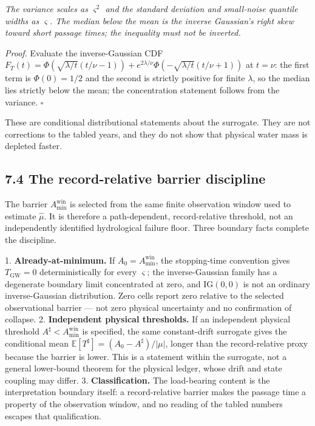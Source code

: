 \documentclass[11pt]{article}
\begin{document}
 \emph{The variance scales as \(\varsigma^2\) and the standard deviation and small-noise quantile widths as \(\varsigma\). The median below the mean is the inverse Gaussian's right skew toward short passage times; the inequality must not be inverted.}

\emph{Proof.} Evaluate the inverse-Gaussian CDF \(F_T(t) =\allowbreak{} \Phi(\sqrt{\lambda/\allowbreak{}t}(t/\nu - 1)) +\allowbreak{} e^{2\lambda/\nu}\Phi(-\sqrt{\lambda/\allowbreak{}t}(t/\nu +\allowbreak{} 1))\) at \(t = \nu\): the first term is \(\Phi(0) = 1/\allowbreak{}2\) and the second is strictly positive for finite \(\lambda\), so the median lies strictly below the mean; the concentration statement follows from the variance. \(\square\)

These are conditional distributional statements about the surrogate. They are not corrections to the tabled years, and they do not show that physical water mass is depleted faster.

\subsection*{7.4 The record-relative barrier discipline}\label{74-the-record-relative-barrier-discipline}

The barrier \(A_{\min}^{\mathrm{win}}\) is selected from the same finite observation window used to estimate \(\widehat\mu\). It is therefore a path-dependent, record-relative threshold, not an independently identified hydrological failure floor. Three boundary facts complete the discipline.

1. \textbf{Already-at-minimum.} If \(A_0 = A_{\min}^{\mathrm{win}}\), the stopping-time convention gives \(T_{\mathrm{GW}} = 0\) deterministically for every \(\varsigma\); the inverse-Gaussian family has a degenerate boundary limit concentrated at zero, and \(\mathrm{IG}(0,0)\) is not an ordinary inverse-Gaussian distribution. Zero cells report zero relative to the selected observational barrier --- not zero physical uncertainty and no confirmation of collapse. 2. \textbf{Independent physical thresholds.} If an independent physical threshold \(A^\sharp < A_{\min}^{\mathrm{win}}\) is specified, the same constant-drift surrogate gives the conditional mean \(\mathbb{E}[T^\sharp] =\allowbreak{} (A_0 - A^\sharp)/|\mu|\), longer than the record-relative proxy because the barrier is lower. This is a statement within the surrogate, not a general lower-bound theorem for the physical ledger, whose drift and state coupling may differ. 3. \textbf{Classification.} The load-bearing content is the interpretation boundary itself: a record-relative barrier makes the passage time a property of the observation window, and no reading of the tabled numbers escapes that qualification.
\end{document}
